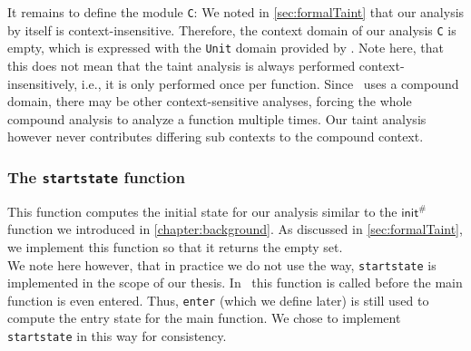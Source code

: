         It remains to define the module \texttt{C}: We noted in \autoref{sec:formalTaint} that our analysis by itself is context-insensitive. Therefore, the context domain of our analysis \texttt{C} is empty, which is expressed with the \texttt{Unit} domain provided by \gob. Note here, that this does not mean that the taint analysis is always performed context-insensitively, i.e., it is only performed once per function. Since \gob\ uses a compound domain, there may be other context-sensitive analyses, forcing the whole compound analysis to analyze a function multiple times. Our taint analysis however never contributes differing sub contexts to the compound context.

      \subsubsection{The \texttt{startstate} function}
        This function computes the initial state for our analysis similar to the $\textsf{init}^{\#}$ function we introduced in \autoref{chapter:background}. As discussed in \autoref{sec:formalTaint}, we implement this function so that it returns the empty set.\\
        We note here however, that in practice we do not use the way, \texttt{startstate} is implemented in the scope of our thesis. In \gob\ this function is called before the main function is even entered. Thus, \texttt{enter} (which we define later) is still used to compute the entry state for the main function. We chose to implement \texttt{startstate} in this way for consistency.

